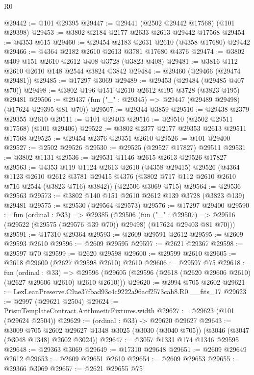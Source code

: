 \begin{lexlean}{R0}
\begin{coremodule}
@29442 := @101 @29395
@29447 := @29441 (@2502 @29442 @17568) (@101 @29398)
@29453 := @3802 @2184 @2177 @2633 @2613 @29442 @17568
@29454 := @4353 @615
@29460 := @29454 @2183 @2631 @2610 (@4358 @17680) @29442
@29466 := @4364 @2182 @2610 @2613 @3781 @17680 @4376
@29474 := @3802 @409 @151 @2610 @2612 @408 @3728 (@3823 @408)
@29481 := @3816 @112 @2610 @2610 @148 @2544 @3824 @3842
@29484 := @29460 (@29466 (@29474 @29481))
@29485 := @17297 @3069
@29489 := @29453 (@29484 (@29485 @407 @70))
@29498 := @3802 @196 @151 @2610 @2612 @195 @3728 (@3823 @195) @29481
@29506 := @29437 (fun ("_" : @29345) => @29447 (@29489 @29498) (@17624 @29395 @81 @70))
@29507 := @29344 @3859
@29510 := @29438 @2379 @29355 @2610
@29511 := @101 @29403
@29516 := @29510 (@2502 @29511 @17568) (@101 @29406)
@29522 := @3802 @2377 @2177 @29353 @2613 @29511 @17568
@29525 := @29454 @2376 @29351 @2610
@29526 := @101 @29400
@29527 := @2502 @29526
@29530 := @29525 (@29527 @17827) @29511
@29531 := @3802 @1131
@29536 := @29531 @1146 @2615 @2613 @29526 @17827
@29563 := @4353
    @119
    @1124
    @2613
    @2610
    (@4358 @29415)
    @29526
    (@4364
      @1123
      @2610
      @2612
      @3781
      @29415
      @4376
      (@3802 @717 @112 @2610 @2610 @716 @2544 (@3823 @716) @3842))
    (@22506 @3069 @715)
@29564 := @29536 @29563
@29573 := @3802 @140 @151 @2610 @2612 @139 @3728 (@3823 @139) @29481
@29575 := @29530 (@29564 @29573)
@29576 := @17297 @29400
@29590 := fun (ordinal : @33) =>
  @29385
    (@29506
      (fun ("_" : @29507) =>
      @29516 (@29522 (@29575 (@29576 @39 @70)) @29498) (@17624 @29403 @81 @70)))
@29591 := @17310 @29364
@29593 := @2609 @29591 @2612
@29595 := @2609 @29593 @2610
@29596 := @2609 @29595
@29597 := @2621 @29367
@29598 := @29597 @70
@29599 := @2620 @29598
@29600 := @29599 @2610
@29605 := @2618 @29600 (@2627 @29598 @2610) @2610
@29606 := @29597 @75
@29618 := fun (ordinal : @33) =>
  @29596 (@29605 (@29596 (@2618 (@2620 @29606 @2610) (@2627 @29606 @2610) @2610 @2610)))
@29620 := @2994 @705 @2602
@29621 := LexLeanPreserve.C9ae37fbad93c4c9222a96acf2573cab8.R0.__fits_17
@29623 := @2997 (@29621 @2504)
@29624 := PrismTemplateContract.ArithmeticFixtures.width
@29627 := @29623 (@101 (@29624 @2504))
@29629 := (ordinal : @33) -> @29620 @29627
@29643 := @3009
    @705
    @2602
    @29627
    @1348
    @3025
    (@3030 (@3040 @705))
    (@3046 (@3047 (@3048 @1348) @2602 @3024))
@29647 := @3057 @1331 @174 @1346 @29595
@29648 := @29363 @3069
@29649 := @17310 @29648
@29651 := @2609 @29649 @2612
@29653 := @2609 @29651 @2610
@29654 := @2609 @29653
@29655 := @29366 @3069
@29657 := @2621 @29655 @75

\end{coremodule}
\end{lexlean}
